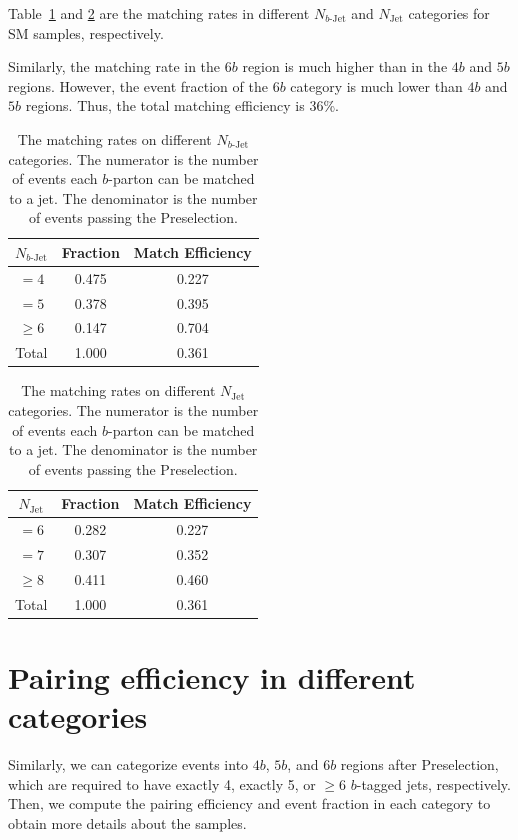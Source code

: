 \documentclass[12pt]{article}
\begin{document}
    Table~\ref{tab:sm_match_rate_nbj} and \ref{tab:sm_match_rate_nj} are the matching rates in different $N_{b\text{-Jet}}$ and $N_{\text{Jet}}$ categories for SM samples, respectively.

    Similarly, the matching rate in the $6b$ region is much higher than in the $4b$ and $5b$ regions. However, the event fraction of the $6b$ category is much lower than $4b$ and $5b$ regions. Thus, the total matching efficiency is 36\%.
    \begin{table}[htpb]
        \centering
        \caption{The matching rates on different $N_{b\text{-Jet}}$ categories. The numerator is the number of events each $b$-parton can be matched to a jet. The denominator is the number of events passing the Preselection.}
        \label{tab:sm_match_rate_nbj}
        \begin{tabular}{c|c|c}
        $N_{b\text{-Jet}}$    & Fraction  & Match Efficiency     \\ \hline
        $=4$                  & 0.475 & 0.227 \\
        $=5$                  & 0.378 & 0.395 \\
        $\ge 6$               & 0.147 & 0.704 \\ \hline
        Total                 & 1.000 & 0.361
        \end{tabular}
    \end{table}
    \begin{table}[htpb]
        \centering
        \caption{The matching rates on different $N_{\text{Jet}}$ categories. The numerator is the number of events each $b$-parton can be matched to a jet. The denominator is the number of events passing the Preselection.}
        \label{tab:sm_match_rate_nj}
        \begin{tabular}{c|c|c}
        $N_{\text{Jet}}$    & Fraction  & Match Efficiency     \\ \hline
        $=6$                  & 0.282 & 0.227 \\
        $=7$                  & 0.307 & 0.352 \\
        $\ge 8$               & 0.411 & 0.460 \\ \hline
        Total                 & 1.000 & 0.361
        \end{tabular}
    \end{table}
\section{Pairing efficiency in different categories}%
\label{sec:pairing_efficiency_in_different_categories}
    Similarly, we can categorize events into $4b$,  $5b$, and $6b$ regions after Preselection, which are required to have exactly 4, exactly 5, or $\ge 6$ $b$-tagged jets, respectively. Then, we compute the pairing efficiency and event fraction in each category to obtain more details about the samples.
\end{document}

